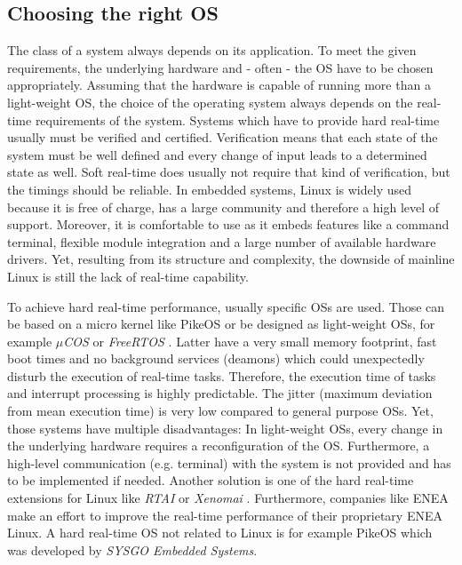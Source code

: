 \subsection{Choosing the right OS}
The class of a system always depends on its application. To meet the given requirements,
the underlying hardware and - often - the OS have to be chosen appropriately. 
Assuming that the hardware is capable of running more than a light-weight OS, the choice of the operating
system always depends on the real-time requirements of the system. 
Systems which have to provide hard real-time usually must be verified and certified. 
Verification means that each state of the system must be well defined and every change of input leads to a
determined state as well.
Soft real-time does usually not require that kind of verification, but the timings should be reliable. 
In embedded systems, Linux is widely used because it is free of charge, has a large community and therefore a high level of support. 
Moreover, it is comfortable to use as it embeds features like a command terminal, flexible module integration and a large number of available hardware drivers.
Yet, resulting from its structure and complexity, the downside of mainline Linux is still the lack of real-time capability.
\par
To achieve hard real-time performance, usually specific \acp{OS} are used. 
Those can be based on a micro kernel like PikeOS \cite{sysgo:prt} or be designed as light-weight \acp{OS}, for example \textit{$\mu$COS} \cite{micrium:microcos} or \textit{FreeRTOS} \cite{freertos}.
Latter have a very small memory footprint, fast boot times and no background services (deamons) which could unexpectedly disturb the execution of real-time tasks. 
Therefore, the execution time of tasks and interrupt processing is highly predictable.
The jitter (maximum deviation from mean execution time) is very low compared to general purpose \acp{OS}.
Yet, those systems have multiple disadvantages:
In light-weight \acp{OS}, every change in the underlying hardware requires a reconfiguration of the OS.
Furthermore, a high-level communication (e.g. terminal) with the system is not provided and has to be implemented if needed. 
Another solution is one of the hard real-time extensions for Linux like \textit{\ac{RTAI}} \cite{rtai} or \textit{Xenomai} \cite{xenomai}.
Furthermore, companies like ENEA \cite{stromblad:elfrtoemd} make an effort to improve the real-time performance of their proprietary ENEA Linux.  
A hard real-time \ac{OS} not related to Linux is for example PikeOS which was developed by \textit{SYSGO Embedded Systems}.

